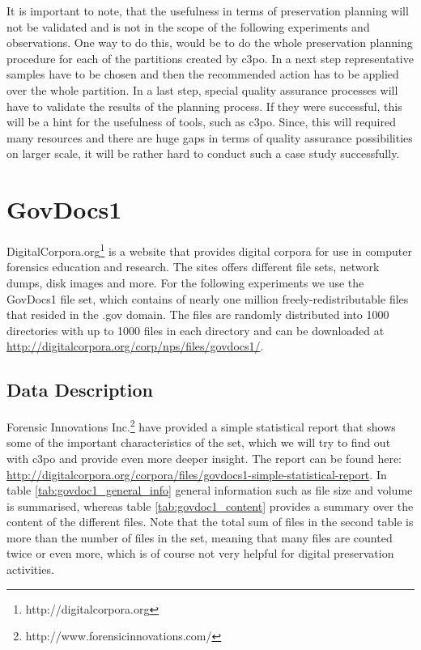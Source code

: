 It is important to note, that the usefulness in terms of preservation planning will not be validated and is not in the scope of the following experiments and observations. One way to do this, would be to do the whole preservation planning procedure for each of the partitions created by c3po. In a next step representative samples have to be chosen and then the recommended action has to be applied over the whole partition. In a last step, special quality assurance processes will have to validate the results of the planning process. If they were successful, this will be a hint for the usefulness of tools, such as c3po. Since, this will required many resources and there are huge gaps in terms of quality assurance possibilities on larger scale, it will be rather hard to conduct such a case study successfully.

\section{GovDocs1}
DigitalCorpora.org\footnote{http://digitalcorpora.org} is a website that provides digital corpora for use in computer forensics education and research. The sites offers different file sets, network dumps, disk images and more. For the following experiments we use the GovDocs1 file set, which contains of nearly one million freely-redistributable files that resided in the .gov domain.
The files are randomly distributed into 1000 directories with up to 1000 files in each directory and can be downloaded at \url{http://digitalcorpora.org/corp/nps/files/govdocs1/}.

\subsection{Data Description}
Forensic Innovations Inc.\footnote{http://www.forensicinnovations.com/} have provided a simple statistical report that shows some of the important characteristics of the set, which we will try to find out with c3po and provide even more deeper insight. The report can be found here: \url{http://digitalcorpora.org/corpora/files/govdocs1-simple-statistical-report}. In table \ref{tab:govdoc1_general_info} general information such as file size and volume is summarised, whereas table \ref{tab:govdoc1_content} provides a summary over the content of the different files. Note that the total sum of files in the second table is more than the number of files in the set, meaning that many files are counted twice or even more, which is of course not very helpful for digital preservation activities.

